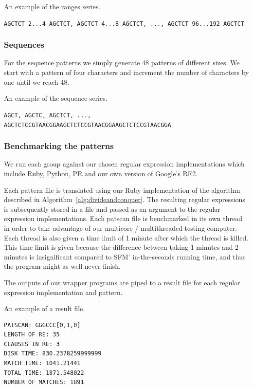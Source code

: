 \documentclass[12pt]{article}
\theoremstyle{definition}
\begin{document}
\begin{example}
An example of the ranges series.

\begin{center}
\texttt{AGCTCT 2...4 AGCTCT, AGCTCT 4...8 AGCTCT, ..., AGCTCT 96...192 AGCTCT}
\end{center}
\end{example}

\subsubsection{Sequences}

For the sequence patterns we simply generate 48 patterns of different sizes. We start with a pattern of four characters and increment the number of characters by one until we reach 48.

\begin{example}
An example of the sequence series.

\begin{center}
\texttt{AGCT, AGCTC, AGCTCT, ..., AGCTCTCCGTAACGGAAGCTCTCCGTAACGGAAGCTCTCCGTAACGGA}
\end{center}
\end{example}

\subsubsection{Benchmarking the patterns}

We run each group against our chosen regular expression implementations which include Ruby, Python, PR and our own version of Google's RE2.
 
Each pattern file is translated using our Ruby implementation of the algorithm described in Algorithm~\ref{alg:divideandconquer}. The resulting regular expressions is subsequently stored in a file and passed as an argument to the regular expression implementations. Each patscan file is benchmarked in its own thread in order to take advantage of our multicore / multithreaded testing computer. Each thread is also given a time limit of 1 minute after which the thread is killed. This time limit is given because the difference between taking 1 minutes and 2 minutes is insignificant compared to SFM' in-the-seconds running time, and thus the program might as well never finish.

The outputs of our wrapper programs are piped to a result file for each regular expression implementation and pattern.

\begin{example} 
An example of a result file.
\begin{verbatim}
PATSCAN: GGGCCC[0,1,0]
LENGTH OF RE: 35
CLAUSES IN RE: 3
DISK TIME: 830.2378259999999
MATCH TIME: 1041.21441
TOTAL TIME: 1871.548022
NUMBER OF MATCHES: 1891
\end{verbatim}
\end{example}
\end{document}
